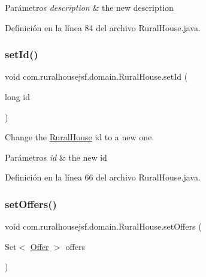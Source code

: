\begin{DoxyParams}{Parámetros}
{\em description} & the new description \\
\hline
\end{DoxyParams}


Definición en la línea 84 del archivo Rural\+House.\+java.

\mbox{\label{classcom_1_1ruralhousejsf_1_1domain_1_1_rural_house_aaea8ea8cb5cb886fb0b7e38bb7546472}} 
\subsubsection{\texorpdfstring{setId()}{setId()}}
{\footnotesize\ttfamily void com.\+ruralhousejsf.\+domain.\+Rural\+House.\+set\+Id (\begin{DoxyParamCaption}\item[{long}]{id }\end{DoxyParamCaption})}



Change the \mbox{\hyperlink{classcom_1_1ruralhousejsf_1_1domain_1_1_rural_house}{Rural\+House}} id to a new one. 


\begin{DoxyParams}{Parámetros}
{\em id} & the new id \\
\hline
\end{DoxyParams}


Definición en la línea 66 del archivo Rural\+House.\+java.

\mbox{\label{classcom_1_1ruralhousejsf_1_1domain_1_1_rural_house_a6edffd501fd0be08f923be5a1615e1fb}} 
\subsubsection{\texorpdfstring{setOffers()}{setOffers()}}
{\footnotesize\ttfamily void com.\+ruralhousejsf.\+domain.\+Rural\+House.\+set\+Offers (\begin{DoxyParamCaption}\item[{Set$<$ \mbox{\hyperlink{classcom_1_1ruralhousejsf_1_1domain_1_1_offer}{Offer}} $>$}]{offers }\end{DoxyParamCaption})}



